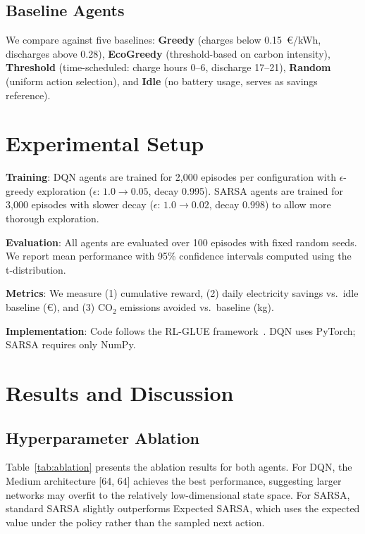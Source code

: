 \documentclass[runningheads]{llncs}
\begin{document}
\subsection{Baseline Agents}

We compare against five baselines: \textbf{Greedy} (charges below 0.15~\euro{}/kWh, discharges above 0.28), \textbf{EcoGreedy} (threshold-based on carbon intensity), \textbf{Threshold} (time-scheduled: charge hours 0--6, discharge 17--21), \textbf{Random} (uniform action selection), and \textbf{Idle} (no battery usage, serves as savings reference).

\section{Experimental Setup}

\textbf{Training}: DQN agents are trained for 2,000 episodes per configuration with $\epsilon$-greedy exploration ($\epsilon$: $1.0 \rightarrow 0.05$, decay 0.995). SARSA agents are trained for 3,000 episodes with slower decay ($\epsilon$: $1.0 \rightarrow 0.02$, decay 0.998) to allow more thorough exploration.

\textbf{Evaluation}: All agents are evaluated over 100 episodes with fixed random seeds. We report mean performance with 95\% confidence intervals computed using the t-distribution.

\textbf{Metrics}: We measure (1) cumulative reward, (2) daily electricity savings vs.\ idle baseline (\euro{}), and (3) CO$_2$ emissions avoided vs.\ baseline (kg).

\textbf{Implementation}: Code follows the RL-GLUE framework~\cite{tanner2009rlglue}. DQN uses PyTorch; SARSA requires only NumPy.

\section{Results and Discussion}

\subsection{Hyperparameter Ablation}

Table~\ref{tab:ablation} presents the ablation results for both agents. For DQN, the Medium architecture [64, 64] achieves the best performance, suggesting larger networks may overfit to the relatively low-dimensional state space. For SARSA, standard SARSA slightly outperforms Expected SARSA, which uses the expected value under the policy rather than the sampled next action.
\end{document}
